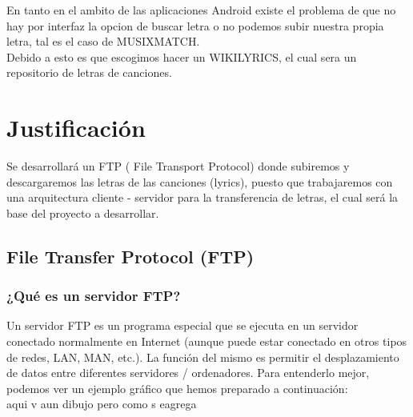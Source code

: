 \documentclass[12pt,A4]{article}
\begin{document}
En tanto en el ambito de las aplicaciones Android existe el problema de que no hay por interfaz la opcion de buscar letra o no podemos subir nuestra propia letra, tal es el caso de MUSIXMATCH.\\

Debido a esto es que escogimos hacer un WIKILYRICS, el cual sera un repositorio de letras de canciones.

\section*{\centering Justificación}
Se desarrollará un FTP ( File Transport Protocol) donde subiremos y descargaremos las letras de las canciones (lyrics), puesto que trabajaremos con una arquitectura cliente - servidor para la transferencia de letras, el cual será la base del proyecto a desarrollar.

	\subsection* {File Transfer Protocol (FTP)}
	
		\subsubsection* {¿Qué es un servidor FTP?}

Un servidor FTP es un programa especial que se ejecuta en un servidor conectado normalmente en Internet (aunque puede estar conectado en otros tipos de redes, LAN, MAN, etc.). La función del mismo es permitir el desplazamiento de datos entre diferentes servidores / ordenadores.
Para entenderlo mejor, podemos ver un ejemplo gráfico que hemos preparado a continuación: \\

aqui v aun dibujo pero como s eagrega
\end{document}
